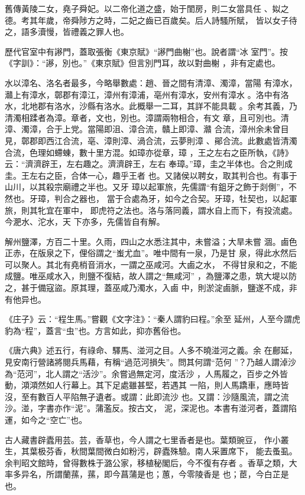 \documentclass{ctexart}
\begin{document}
舊傳黃陵二女，堯子舜妃。以二帝化道之盛，始于閨房，則二女當具任 、姒之德。考其年歲，帝舜陟方之時，二妃之齒已百歲矣。后人詩騷所賦， 皆以女子待之，語多瀆慢，皆禮義之罪人也。

歷代官室中有謻門，蓋取張衡《東京賦》``謻門曲榭''也。說者謂``冰 室門''。按《字訓》：``謻，別也。''《東京賦》但言別門耳，故以對曲榭 ，非有定處也。

水以漳名、洛名者最多，今略舉數處：趙、晉之間有清漳、濁漳，當陽 有漳水，灨上有漳水，鄣郡有漳江，漳州有漳浦，亳州有漳水，安州有漳水 。洛中有洛水，北地郡有洛水，沙縣有洛水。此概舉一二耳，其詳不能具載 。余考其義，乃清濁相蹂者為漳。章者，文也，別也。漳謂兩物相合，有文 章，且可別也。清漳、濁漳，合于上党。當陽即沮、漳合流，贛上即漳、灨 合流，漳州余未曾目見，鄣郡即西江合流，亳、漳則漳、渦合流，云夢則漳 、鄖合流。此數處皆清濁合流，色理如螮蝀，數十里方混。如璋亦從章，璋 ，王之左右之臣所執，《詩》云：``濟濟辟王，左右趣之。濟濟辟王，左右 奉璋。''璋，圭之半体也。合之則成圭。王左右之臣，合体一心，趣乎王者 也。又諸侯以聘女，取其判合也。有事于山川，以其殺宗廟禮之半也。又牙 璋以起軍旅，先儒謂``有鉏牙之飾于剡側''，不然也。牙璋，判合之器也， 當于合處為牙，如今之合契。牙璋，牡契也，以起軍旅，則其牝宜在軍中， 即虎符之法也。洛与落同義，謂水自上而下，有投流處。今淝水、沱水，天 下亦多，先儒皆自有解。

解州鹽澤，方百二十里。久雨，四山之水悉注其中，未嘗溢；大旱未嘗 涸。鹵色正赤，在版泉之下，俚俗謂之``蚩尤血''。唯中間有一泉，乃是甘 泉，得此水然后可以聚人。其北有堯梢音消水，一謂之巫咸河。大鹵之水， 不得甘泉和之，不能成鹽。唯巫咸水入，則鹽不復結，故人謂之``無咸河'' ，為鹽澤之患，筑大堤以防之，甚于備寇盜。原其理，蓋巫咸乃濁水，入鹵 中，則淤淀鹵脈，鹽遂不成，非有他异也。

《庄子》云：``程生馬。''嘗觀《文字注》：``秦人謂豹曰程。''余至 延州，人至今謂虎豹為``程''，蓋言``虫''也。方言如此，抑亦舊俗也。

《唐六典》述五行，有祿命、驛馬、湴河之目。人多不曉湴河之義。余 在鄜延，見安南行營諸將閱兵馬藉，有稱``過范河損失''。問其何謂``范何 ''？乃越人謂淖沙為``范河''，北人謂之``活沙''。余嘗過無定河，度活沙 ，人馬履之，百步之外皆動，澒澒然如人行幕上。其下足處雖甚堅，若遇其 一陷，則人馬蹻車，應時皆沒，至有數百人平陷無孑遺者。或謂：此即流沙 也。又謂：沙隨風流，謂之流沙。湴，字書亦作``泥''。蒲濫反。按古文， 泥，深泥也。本書有湴河者，蓋謂陷運，如今之``空亡''也。

古人藏書辟蠹用芸。芸，香草也，今人謂之七里香者是也。葉類豌豆， 作小叢生，其葉极芬香，秋間葉間微白如粉污，辟蠹殊驗。南人采置席下， 能去蚤虱。余判昭文館時，曾得數株于潞公家，移植秘閣后，今不復有存者 。香草之類，大率多异名，所謂蘭蓀，蓀，即今菖蒲是也；蕙，今零陵香是 也；茞，今白芷是也。
\end{document}
